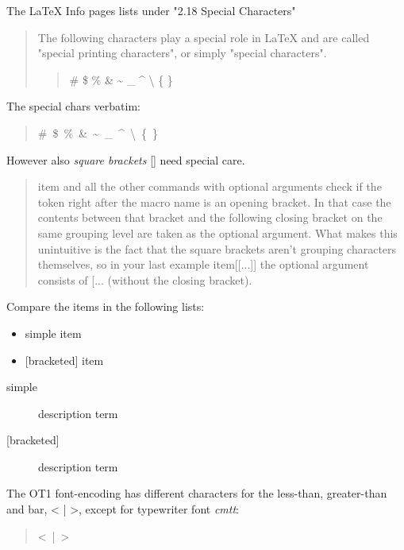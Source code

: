 \documentclass[a4paper]{article}
\providecommand*{\DUroletitlereference}[1]{\textsl{#1}}
\begin{document}
The LaTeX Info pages lists under "2.18 Special Characters"
%
\begin{quote}

The following characters play a special role in LaTeX and are called
"special printing characters", or simply "special characters".
%
\begin{quote}

\# \$ \% \& \textasciitilde{} \_ \textasciicircum{} \textbackslash{} \{ \}

\end{quote}

\end{quote}

The special chars verbatim:
%
\begin{quote}{\ttfamily \raggedright \noindent
\#~\$~\%~\&~\textasciitilde{}~\_~\textasciicircum{}~\textbackslash{}~\{~\}
}
\end{quote}

However also \emph{square brackets} {[}{]} need special care.
%
\begin{quote}

item and all the other commands with optional arguments check
if the token right after the macro name is an opening bracket.
In that case the contents between that bracket and the following
closing bracket on the same grouping level are taken as the
optional argument. What makes this unintuitive is the fact that
the square brackets aren't grouping characters themselves, so in
your last example item{[}{[}...{]}{]} the optional argument consists of
{[}... (without the closing bracket).

\end{quote}

Compare the items in the following lists:
%
\begin{itemize}

\item simple item

\item {[}bracketed{]} item

\end{itemize}
%
\begin{description}
\item[{simple}] \leavevmode 
description term

\item[{{[}bracketed{]}}] \leavevmode 
description term

\end{description}

The OT1 font-encoding has different characters for the less-than,
greater-than and bar, < | >, except for typewriter font \DUroletitlereference{cmtt}:
%
\begin{quote}{\ttfamily \raggedright \noindent
<~|~>
}
\end{quote}
\end{document}
